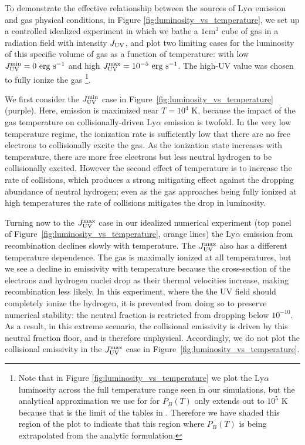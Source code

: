 To demonstrate the effective relationship between the sources of Ly$\alpha$ emission and gas physical conditions, in Figure \ref{fig:luminosity_vs_temperature}, we set up a controlled idealized experiment in which we bathe a $1$cm$^{3}$ cube of gas in a radiation field with intensity $J_{\rm UV}$, and plot two limiting cases for the luminosity of this specific volume of gas as a function of temperature: with low $J_{\rm UV}^{\rm min} = 0\ \rm erg\ \rm s^{-1}$ and high $J_{\rm UV}^{\rm max} = 10^{-5}\ \rm erg\ \rm s^{-1}$.
The high-UV value was chosen to fully ionize the gas
\footnote{
    Note that in Figure \ref{fig:luminosity_vs_temperature} we plot the Ly$\alpha$ luminosity across the full temperature range seen in our simulations, but the analytical approximation we use for for $P_B(T)$ only extends out to $10^5$ K because that is the limit of the tables in \citet{Pengelly1964}.
    Therefore we have shaded this region of the plot to indicate that this region where $P_B\left(T\right)$ is being extrapolated from the analytic formulation.
}.

We first consider the $J_{\rm UV}^{\rm min}$ case in Figure~\ref{fig:luminosity_vs_temperature} (purple).
Here, emission is maximized near $T=10^4$ K, because the impact of the gas temperature on collisionally-driven Ly$\alpha$ emission is twofold.
In the very low temperature regime, the ionization rate is sufficiently low that there are no free electrons to collisionally excite the gas.
As the ionization state increases with temperature, there are more free electrons but less neutral hydrogen to be collisionally excited.
However the second effect of temperature is to increase the rate of collisions, which produces a strong mitigating effect against the dropping abundance of neutral hydrogen; even as the gas approaches being fully ionized at high temperatures the rate of collisions mitigates the drop in luminosity.

Turning now to the $J_{\rm UV}^{\rm max}$ case in our idealized numerical experiment (top panel of Figure~\ref{fig:luminosity_vs_temperature}, orange lines) the Ly$\alpha$ emission from recombination declines slowly with temperature.
The $J_{\rm UV}^{\rm max}$ also has a different temperature dependence.
The gas is maximally ionized at all temperatures, but we see a decline in emissivity with temperature because the cross-section of the electrons and hydrogen nuclei drop as their thermal velocities increase, making recombination less likely.
In this experiment, where the the UV field should completely ionize the hydrogen, it is prevented from doing so to preserve numerical stability: the neutral fraction is restricted from dropping below $10^{-10}$.
As a result, in this extreme scenario, the collisional emissivity is driven by this neutral fraction floor, and is therefore unphysical.
Accordingly, we do not plot the collisional emissivity in the $J_{\rm UV}^{\rm max}$ case in Figure~\ref{fig:luminosity_vs_temperature}.

